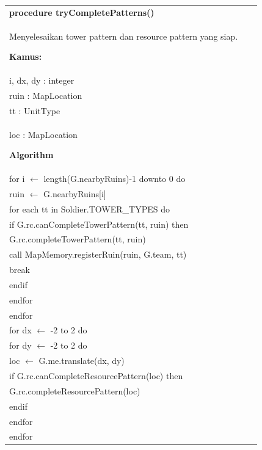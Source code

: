 \documentclass{article}
\newenvironment{pseudobox}
{
\centering
\begin{longtable}{|p{0.94\linewidth}|}
\hline
}
{
\\ \hline
\end{longtable}
\vspace{0.05cm}
}
\begin{document}
\begin{pseudobox}
\textbf{procedure tryCompletePatterns()} \\
{ Menyelesaikan tower pattern dan resource pattern yang siap. }

\textbf{Kamus:} \\
\hspace*{1em} i, dx, dy : integer \\
\hspace*{1em} ruin : MapLocation \\
\hspace*{1em} tt : UnitType \\
\hspace*{1em} loc : MapLocation

\textbf{Algorithm} \\
\hspace*{1em} for i $\leftarrow$ length(G.nearbyRuins)-1 downto 0 do \\
\hspace*{2em} ruin $\leftarrow$ G.nearbyRuins[i] \\
\hspace*{2em} for each tt in Soldier.TOWER\_TYPES do \\
\hspace*{3em} if G.rc.canCompleteTowerPattern(tt, ruin) then \\
\hspace*{4em} G.rc.completeTowerPattern(tt, ruin) \\
\hspace*{4em} call MapMemory.registerRuin(ruin, G.team, tt) \\
\hspace*{4em} break \\
\hspace*{3em} endif \\
\hspace*{2em} endfor \\
\hspace*{1em} endfor \\

\hspace*{1em} for dx $\leftarrow$ -2 to 2 do \\
\hspace*{2em} for dy $\leftarrow$ -2 to 2 do \\
\hspace*{3em} loc $\leftarrow$ G.me.translate(dx, dy) \\
\hspace*{3em} if G.rc.canCompleteResourcePattern(loc) then \\
\hspace*{4em} G.rc.completeResourcePattern(loc) \\
\hspace*{3em} endif \\
\hspace*{2em} endfor \\
\hspace*{1em} endfor
\end{pseudobox}
\end{document}
